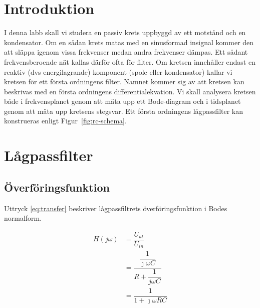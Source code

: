 %
%

\section{Introduktion}\label{intro}
I denna labb skall vi studera en passiv krets uppbyggd av ett motstånd och en
kondensator. Om en sådan krets matas med en sinusformad insignal kommer den att
släppa igenom vissa frekvenser medan andra frekvenser dämpas. Ett sådant
frekvensberoende nät kallas därför ofta för filter. Om kretsen innehåller
endast en reaktiv (dvs energilagrande) komponent (spole eller kondensator)
kallar vi kretsen för ett första ordningens filter. Namnet kommer sig av att
kretsen kan beskrivas med en första ordningens differentialekvation.  Vi skall
analysera kretsen både i frekvensplanet genom att mäta upp ett Bode-diagram och
i tidsplanet genom att mäta upp kretsens stegsvar.  Ett första ordningens
lågpassfilter kan konstrueras enligt Figur~\ref{fig:rc-schema}.

\section{Lågpassfilter}
\subsection{Överföringsfunktion}
Uttryck \eqref{eq:transfer} beskriver lågpassfiltrets överföringsfunktion i
Bodes normalform.

\begin{equation*}
  \begin{split}
    H(j\omega) &= \dfrac{U_{ut}}{U_{in}}                                      \\
               &= \dfrac{\dfrac{1}{\jmath\omega C}}{R + \dfrac{1}{j\omega C}} \\
               &= \dfrac{1}{1+\jmath\omega R C}                               \\
  \end{split}
\end{equation*}

